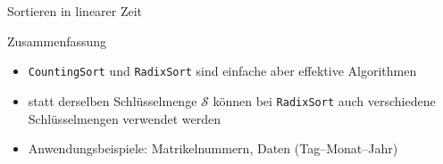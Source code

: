 \documentclass[aspectratio=1610, 11pt]{beamer}
\newcommand\cS{\mathcal S}
\begin{document}
\begin{frame}{Sortieren in linearer Zeit}
	\begin{exampleblock}{Zusammenfassung}
		\begin{itemize}
			\item {\tt CountingSort} und {\tt RadixSort} sind einfache aber effektive Algorithmen
			\item statt derselben Schl\"usselmenge $\cS$ k\"onnen bei {\tt RadixSort} auch verschiedene Schl\"usselmengen verwendet werden
			\item \alert{Anwendungsbeispiele:} Matrikelnummern, Daten (Tag--Monat--Jahr)
		\end{itemize}
	\end{exampleblock}
\end{frame}
\end{document}

